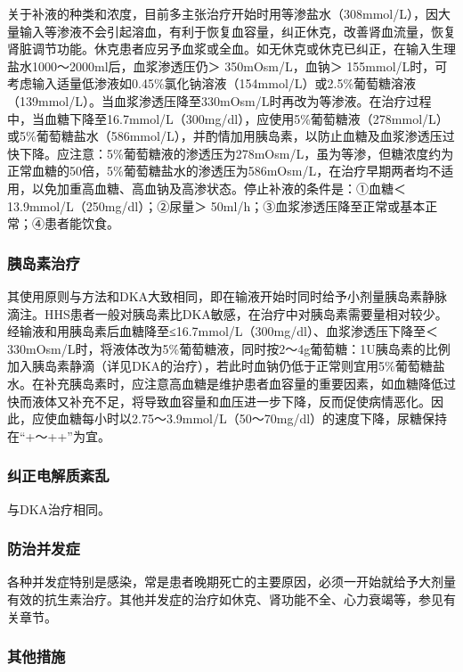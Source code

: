 关于补液的种类和浓度，目前多主张治疗开始时用等渗盐水（308mmol/L），因大量输入等渗液不会引起溶血，有利于恢复血容量，纠正休克，改善肾血流量，恢复肾脏调节功能。休克患者应另予血浆或全血。如无休克或休克已纠正，在输入生理盐水1000～2000ml后，血浆渗透压仍＞
350mOsm/L，血钠＞
155mmol/L时，可考虑输入适量低渗液如0.45\%氯化钠溶液（154mmol/L）或2.5\%葡萄糖溶液（139mmol/L）。当血浆渗透压降至330mOsm/L时再改为等渗液。在治疗过程中，当血糖下降至16.7mmol/L（300mg/dl），应使用5\%葡萄糖液（278mmol/L）或5\%葡萄糖盐水（586mmol/L），并酌情加用胰岛素，以防止血糖及血浆渗透压过快下降。应注意：5\%葡萄糖液的渗透压为278mOsm/L，虽为等渗，但糖浓度约为正常血糖的50倍，5\%葡萄糖盐水的渗透压为586mOsm/L，在治疗早期两者均不适用，以免加重高血糖、高血钠及高渗状态。停止补液的条件是：①血糖＜
13.9mmol/L（250mg/dl）；②尿量＞
50ml/h；③血浆渗透压降至正常或基本正常；④患者能饮食。

\subsubsection{胰岛素治疗}

其使用原则与方法和DKA大致相同，即在输液开始时同时给予小剂量胰岛素静脉滴注。HHS患者一般对胰岛素比DKA敏感，在治疗中对胰岛素需要量相对较少。经输液和用胰岛素后血糖降至≤16.7mmol/L（300mg/dl）、血浆渗透压下降至＜
330mOsm/L时，将液体改为5\%葡萄糖液，同时按2～4g葡萄糖：1U胰岛素的比例加入胰岛素静滴（详见DKA的治疗），若此时血钠仍低于正常则宜用5\%葡萄糖盐水。在补充胰岛素时，应注意高血糖是维护患者血容量的重要因素，如血糖降低过快而液体又补充不足，将导致血容量和血压进一步下降，反而促使病情恶化。因此，应使血糖每小时以2.75～3.9mmol/L（50～70mg/dl）的速度下降，尿糖保持在“+～++”为宜。

\subsubsection{纠正电解质紊乱}

与DKA治疗相同。

\subsubsection{防治并发症}

各种并发症特别是感染，常是患者晚期死亡的主要原因，必须一开始就给予大剂量有效的抗生素治疗。其他并发症的治疗如休克、肾功能不全、心力衰竭等，参见有关章节。

\subsubsection{其他措施}

